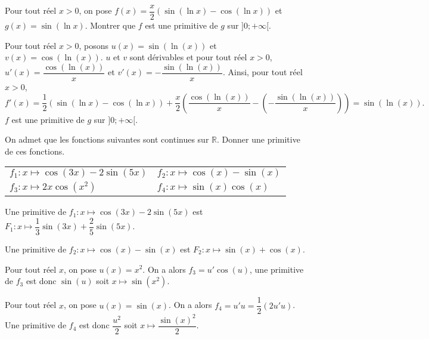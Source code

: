 \documentclass[11pt,fleqn, openany]{book} %
\begin{document}
\begin{exercise}[topic=trig02]Pour tout réel $x>0$, on pose $f(x)=\dfrac{x}{2}\left(\sin(\ln x)-\cos(\ln x)\right)$ et $g(x)=\sin(\ln x)$. Montrer que $f$ est une primitive de $g$ sur $]0;+\infty[$.\end{exercise}

\begin{solution}Pour tout réel $x>0$, posons $u(x)=\sin(\ln(x))$ et $v(x)=\cos(\ln(x))$. $u$ et $v$ sont dérivables et pour tout réel $x>0$, $u'(x)=\dfrac{\cos(\ln(x))}{x}$ et $v'(x)=-\dfrac{\sin(\ln(x))}{x}$. Ainsi, pour tout réel $x>0$,
\[f'(x)=\dfrac{1}{2}(\sin(\ln x)-\cos(\ln x))+\dfrac{x}{2}\left(\dfrac{\cos(\ln(x))}{x} -\left(-\dfrac{\sin(\ln(x))}{x}\right)\right)=\sin(\ln(x)).\]
$f$ est une primitive de $g$ sur $]0;+\infty[$.

\end{solution}




\begin{exercise}[topic=trig02]On admet que les fonctions suivantes sont continues sur $\mathbb{R}$. Donner une primitive de ces fonctions.
\renewcommand{\arraystretch}{1}

\begin{tabularx}{\linewidth}{XX}
$f_1:x\mapsto \cos(3x)-2\sin(5x)$
& $f_2:x\mapsto \cos(x)-\sin(x)$ \\
 $f_3:x \mapsto 2x\cos(x^2)$
& $f_4:x \mapsto\sin(x)\cos(x)$ \\
\end{tabularx}
\end{exercise}

\begin{solution}

Une primitive de $f_1:x\mapsto \cos(3x)-2\sin(5x)$ est $F_1:x \mapsto \dfrac{1}{3}\sin(3x)+\dfrac{2}{5}\sin(5x)$.

Une primitive de $f_2:x\mapsto \cos(x)-\sin(x)$ est $F_2:x \mapsto \sin(x) + \cos(x)$.

Pour tout réel $x$, on pose $u(x)=x^2$. On a alors $f_3 = u'\cos(u)$, une primitive de $f_3$ est donc $\sin(u)$ soit $x\mapsto \sin(x^2)$.

Pour tout réel $x$, on pose $u(x)=\sin(x)$. On a alors $f_4=u'u = \dfrac{1}{2} (2u'u)$.\\ Une primitive de $f_4$ est donc $\dfrac{u^2}{2}$ soit $x\mapsto \dfrac{\sin(x)^2}{2}$.

\end{solution}
\end{document}
